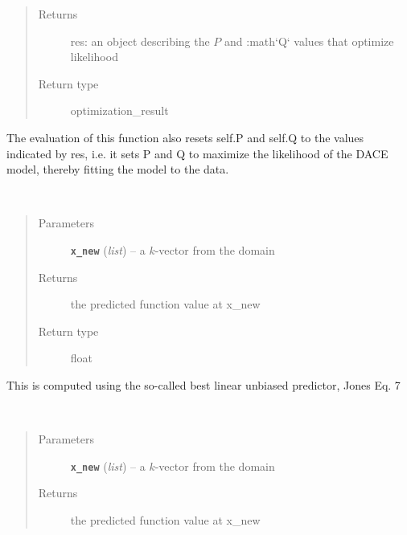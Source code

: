 \documentclass[letterpaper,10pt,english]{sphinxmanual}
\begin{document}
\begin{fulllineitems}
\begin{fulllineitems}
\begin{quote}
\begin{description}
\item[{Returns}] \leavevmode
res: an object describing the \(P\) and :math{}`Q{}` values that optimize likelihood

\item[{Return type}] \leavevmode
optimization\_result

\end{description}\end{quote}

The evaluation of this function also resets self.P and self.Q to the values indicated by res, i.e.
it sets P and Q to maximize the likelihood of the DACE model, thereby fitting the model to the data.

\end{fulllineitems}


\begin{fulllineitems}
\label{index:smbo.models.dace.pred_err}~\begin{quote}\begin{description}
\item[{Parameters}] \leavevmode
\textbf{\texttt{x\_new}} (\emph{list}) -- a \(k\)-vector from the domain

\item[{Returns}] \leavevmode
the predicted function value at x\_new

\item[{Return type}] \leavevmode
float

\end{description}\end{quote}

This is computed using the so-called best linear unbiased predictor,  Jones Eq. 7

\end{fulllineitems}


\begin{fulllineitems}
\label{index:smbo.models.dace.predict}~\begin{quote}\begin{description}
\item[{Parameters}] \leavevmode
\textbf{\texttt{x\_new}} (\emph{list}) -- a \(k\)-vector from the domain

\item[{Returns}] \leavevmode
the predicted function value at x\_new


\end{description}
\end{quote}
\end{fulllineitems}
\end{fulllineitems}
\end{document}
